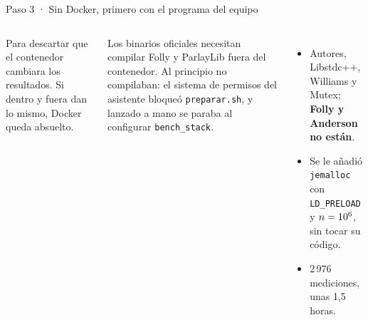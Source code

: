 \begin{frame}{Paso 3 · Sin Docker, primero con el programa del equipo}
  \begin{columns}[T]
    \small
    Para descartar que el contenedor cambiara los resultados. Si dentro y fuera dan lo mismo, Docker queda absuelto.
    \par\medskip
    Los binarios oficiales necesitan compilar Folly y ParlayLib fuera del contenedor. Al principio no compilaban: el sistema de permisos del asistente bloqueó \texttt{preparar.sh}, y lanzado a mano se paraba al configurar \texttt{bench\_stack}.
    \begin{itemize}\footnotesize
      \item Autores, Libstdc++, Williams y Mutex; \textbf{Folly y Anderson no están}.
      \item Se le añadió \texttt{jemalloc} con \texttt{LD\_PRELOAD} y $n = 10\textsuperscript{6}$, sin tocar su código.
      \item 2\,976 mediciones, unas 1,5 horas.
    \end{itemize}
  \end{columns}
  \vfill
\end{frame}

